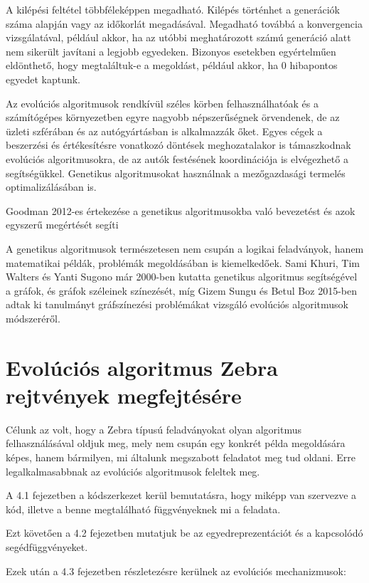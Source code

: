 \documentclass[12pt,a4paper,oneside]{report}
\begin{document}
A kilépési feltétel többféleképpen megadható. Kilépés történhet a generációk száma alapján vagy az időkorlát megadásával. Megadható továbbá a konvergencia vizsgálatával, például akkor, ha az utóbbi meghatározott számú generáció alatt nem sikerült javítani a legjobb egyedeken. Bizonyos esetekben egyértelműen eldönthető, hogy megtaláltuk-e a megoldást, például akkor, ha 0 hibapontos egyedet kaptunk.

Az evolúciós algoritmusok rendkívül széles körben felhasználhatóak és a számítógépes környezetben egyre nagyobb népszerűségnek örvendenek, de az üzleti szférában és az autógyártásban is alkalmazzák őket. Egyes cégek a beszerzési és értékesítésre vonatkozó döntések meghozatalakor is támaszkodnak evolúciós algoritmusokra, de az autók festésének koordinációja is elvégezhető a segítségükkel. Genetikus algoritmusokat használnak a mezőgazdasági termelés optimalizálásában is.

Goodman 2012-es értekezése a genetikus algoritmusokba való bevezetést és azok egyszerű megértését segíti\cite{Goodman:2012:IGA:2330784.2330911}

A genetikus algoritmusok természetesen nem csupán a logikai feladványok, hanem matematikai példák, problémák megoldásában is kiemelkedőek. Sami Khuri, Tim Walters és Yanti Sugono már 2000-ben kutatta genetikus algoritmus segítségével a gráfok, és gráfok széleinek színezését\cite{Khuri:2000:GGA:335603.335880}, míg Gizem Sungu és Betul Boz 2015-ben adtak ki tanulmányt gráfszínezési problémákat vizsgáló evolúciós algoritmusok módszeréről\cite{Sungu:2015:EAW:2739482.2768488}.



\chapter{Evolúciós algoritmus Zebra rejtvények megfejtésére} %
	Célunk az volt, hogy a Zebra típusú feladványokat olyan algoritmus felhasználásával oldjuk meg, mely nem csupán egy konkrét példa megoldására képes, hanem bármilyen, mi általunk megszabott feladatot meg tud oldani.
    Erre legalkalmasabbnak az evolúciós algoritmusok feleltek meg.

	{A 4.1 fejezetben a kódszerkezet kerül bemutatásra, hogy miképp van szervezve a kód, illetve a benne megtalálható függvényeknek mi a feladata.}

	{Ezt követően a 4.2 fejezetben mutatjuk be az egyedreprezentációt és a kapcsolódó segédfüggvényeket.}

	{Ezek után a 4.3 fejezetben részletezésre kerülnek az evolúciós mechanizmusok:}
\end{document}
